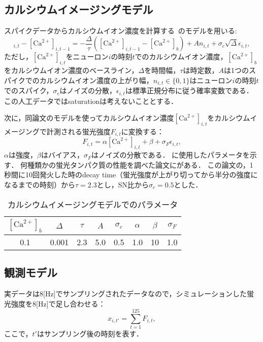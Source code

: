 \subsection{カルシウムイメージングモデル}
スパイクデータからカルシウムイオン濃度を計算する~\cite{Vogelstein2009}のモデルを用いる:
\begin{equation}
  [\text{Ca}^{2+}]_{i,t} - [\text{Ca}^{2+}]_{i,t-1} = - \frac{\Delta}{\tau}([\text{Ca}^{2+}]_{i,t-1} - [\text{Ca}^{2+}]_b) + An_{i,t} + \sigma_c \sqrt{\Delta} \epsilon_{i,t},
  \label{eq:calcium}
\end{equation}
ただし，$[\text{Ca}^{2+}]_{i,t}$をニューロン$i$の時刻$t$でのカルシウムイオン濃度，$[\text{Ca}^{2+}]_b$をカルシウムイオン濃度のベースライン，$\Delta$を時間幅，$\tau$は時定数，$A$は1つのスパイクでのカルシウムイオン濃度の上がり幅，$n_{i,t} \in \{0,1\}$はニューロン$i$の時刻$t$でのスパイク，$\sigma_c$はノイズの分散，$\epsilon_{i,t}$は標準正規分布に従う確率変数である．
この人工データではsaturationは考えないこととする．

次に，同論文のモデルを使ってカルシウムイオン濃度$[\text{Ca}^{2+}]_{i,t}$をカルシウムイメージングで計測される蛍光強度$F_{i,t}$に変換する：
\begin{equation}
	F_{i,t} = \alpha[\text{Ca}^{2+}]_{i,t} + \beta + \sigma_F \epsilon_{i,t},
  \label{eq:intensity}
\end{equation}
$\alpha$は強度，$\beta$はバイアス，$\sigma_F$はノイズの分散である．
に使用したパラメータを示す．
何種類かの蛍光タンパク質の性能を調べた論文に\cite{Chen2013a}がある．
この論文の，1秒間に10回発火した時のdecay time（蛍光強度が上がり切ってから半分の強度になるまでの時刻）から$\tau = 2.3$とし，SN比から$\sigma_c = 0.5$とした．

\begin{table}[htb]
  \center
  \begin{tabular}{|cccccccc|} \hline
    $[\text{Ca}^{2+}]_b$ & $\Delta$ & $\tau$ & $A$ & $\sigma_c$ & $\alpha$ & $\beta$ & $\sigma_F$ \\ \hline
    0.1 & 0.001 & 2.3 & 5.0 & 0.5 & 1.0 & 10 & 1.0 \\ \hline
  \end{tabular}
  \caption{カルシウムイメージングモデルでのパラメータ}
  \label{tab:parameter2}
\end{table}

\subsection{観測モデル}
実データは8[Hz]でサンプリングされたデータなので，シミュレーションした蛍光強度を8[Hz]で足し合わせる：
\begin{equation}
  x_{i,t'} = \sum_{t=1}^{125} F_{i,t},
  \label{eq:observation}
\end{equation}
ここで，$t'$はサンプリング後の時刻を表す．

